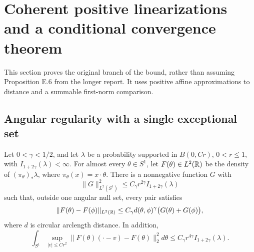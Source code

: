 \section{Coherent positive linearizations and a conditional convergence theorem}
\label{sec:coherenttree}

This section proves the original branch of the bound, rather than assuming Proposition E.6 from the longer report. It uses positive affine approximations to distance and a summable first-norm comparison.

\subsection{Angular regularity with a single exceptional set}

\begin{lemma}\label{lem:coherentangular}
Let \(0<\gamma<1/2\), and let \(\lambda\) be a probability supported in \(B(0,Cr)\), \(0<r\leq1\), with \(I_{1+2\gamma}(\lambda)<\infty\). For almost every \(\theta\in S^1\), let \(F(\theta)\in L^2(\mathbb R)\) be the density of \((\pi_\theta)_*\lambda\), where \(\pi_\theta(x)=x\cdot\theta\). There is a nonnegative function \(G\) with
$$
\|G\|_{L^2(S^1)}^2\leq C_\gamma r^{2\gamma}I_{1+2\gamma}(\lambda)
$$
such that, outside one angular null set, every pair satisfies
$$
\|F(\theta)-F(\phi)\|_{L^2(\mathbb R)}
\leq C_\gamma d(\theta,\phi)^\gamma\bigl(G(\theta)+G(\phi)\bigr),
$$
where \(d\) is circular arclength distance. In addition,
$$
\int_{S^1}\sup_{|v|\leq Cr^2}
\|F(\theta)(\cdot-v)-F(\theta)\|_2^2d\theta
\leq C_\gamma r^{4\gamma}I_{1+2\gamma}(\lambda).
$$
\end{lemma}
